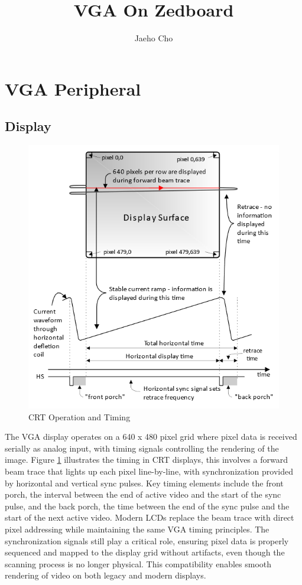 \documentclass{article}
\title{VGA On Zedboard}
\author{Jaeho Cho}
\begin{document}
\maketitle

\section{VGA Peripheral}

\subsection{Display}

\begin{figure}[hb]
    \centering
    \includegraphics[width=0.75\linewidth]{CRT Operation and Timing.png}
    \caption{CRT Operation and Timing}
    \label{fig:CRT Op}
\end{figure}

The VGA display operates on a 640 x 480 pixel grid where pixel data is received serially as analog input, with timing signals controlling the rendering of the image. Figure \cref{fig:CRT Op} illustrates the timing in CRT displays, this involves a forward beam trace that lights up each pixel line-by-line, with synchronization provided by horizontal and vertical sync pulses. Key timing elements include the front porch, the interval between the end of active video and the start of the sync pulse, and the back porch, the time between the end of the sync pulse and the start of the next active video. Modern LCDs replace the beam trace with direct pixel addressing while maintaining the same VGA timing principles. The synchronization signals still play a critical role, ensuring pixel data is properly sequenced and mapped to the display grid without artifacts, even though the scanning process is no longer physical. This compatibility enables smooth rendering of video on both legacy and modern displays.
\end{document}
